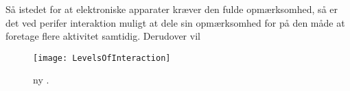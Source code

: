  Så istedet for at elektroniske apparater kræver den fulde opmærksomhed, så er det ved perifer interaktion muligt at dele sin opmærksomhed for på den måde at foretage flere aktivitet samtidig. Derudover vil       

  



%
\begin{figure}[H]
	\centering
	\texttt{[image: LevelsOfInteraction]}
	\caption{ny \textcite[s. 118]{PDF:PeripheralInteraction}.}
	\label{fig:LevelsOfInteraction}
\end{figure}
\noindent
%

